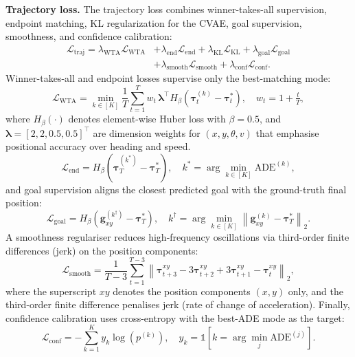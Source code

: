 \textbf{Trajectory loss.}
The trajectory loss combines winner-takes-all supervision, endpoint matching, KL regularization for the CVAE, goal supervision, smoothness, and confidence
calibration:
\begin{align}
\mathcal{L}_{\text{traj}} =
\lambda_{\text{WTA}}\mathcal{L}_{\text{WTA}}&+
\lambda_{\text{end}}\mathcal{L}_{\text{end}}+
\lambda_{\text{KL}}\mathcal{L}_{\text{KL}}+
\lambda_{\text{goal}}\mathcal{L}_{\text{goal}}\nonumber\\
&+\lambda_{\text{smooth}}\mathcal{L}_{\text{smooth}}+
\lambda_{\text{conf}}\mathcal{L}_{\text{conf}}.\nonumber
\end{align}
Winner-takes-all and endpoint losses supervise only the best-matching mode:
\begin{equation}
\mathcal{L}_{\text{WTA}}=\min_{k\in[K]}\frac{1}{T}\sum_{t=1}^{T} w_t\,
\boldsymbol{\lambda}^\top H_\beta\!\left(\boldsymbol{\tau}^{(k)}_t-\boldsymbol{\tau}^{*}_t\right),
\quad w_t = 1 + \tfrac{t}{T},
\end{equation}
where $H_\beta(\cdot)$ denotes element-wise Huber loss with $\beta{=}0.5$, and $\boldsymbol{\lambda}{=}[2,2,0.5,0.5]^\top$ are dimension weights for $(x,y,\theta,v)$ that emphasise positional accuracy over heading and speed.
\begin{equation}
\mathcal{L}_{\text{end}}=H_\beta\!\left(\boldsymbol{\tau}^{(k^*)}_T-\boldsymbol{\tau}^*_T\right),
\quad k^*=\arg\min_{k\in[K]}\text{ADE}^{(k)},
\end{equation}
and goal supervision aligns the closest predicted goal with the ground-truth final position:
\begin{equation}
\mathcal{L}_{\text{goal}}=H_\beta\!\left(\mathbf{g}_{xy}^{(k^\dagger)}-\boldsymbol{\tau}^*_T\right),
\quad k^\dagger = \arg\min_{k\in[K]}\left\|\mathbf{g}_{xy}^{(k)}-\boldsymbol{\tau}^*_T\right\|_2.
\end{equation}
A smoothness regulariser reduces high-frequency oscillations via third-order finite differences (jerk) on the position components:
\begin{equation}
\mathcal{L}_{\text{smooth}}=\frac{1}{T-3}\sum_{t=1}^{T-3}
\left\|\boldsymbol{\tau}^{xy}_{t+3}-3\boldsymbol{\tau}^{xy}_{t+2}
+3\boldsymbol{\tau}^{xy}_{t+1}-\boldsymbol{\tau}^{xy}_t\right\|_2,
\end{equation}
where the superscript $xy$ denotes the position components $(x,y)$ only, and the third-order finite difference penalises jerk (rate of change of acceleration). Finally, confidence calibration uses cross-entropy with the best-ADE mode as the target:
\begin{equation}
\mathcal{L}_{\text{conf}}=-\sum_{k=1}^{K} y_k\log(p^{(k)}), \quad y_k=\mathbb{1}\!\left[k=\arg\min_{j}\text{ADE}^{(j)}\right].
\end{equation}

